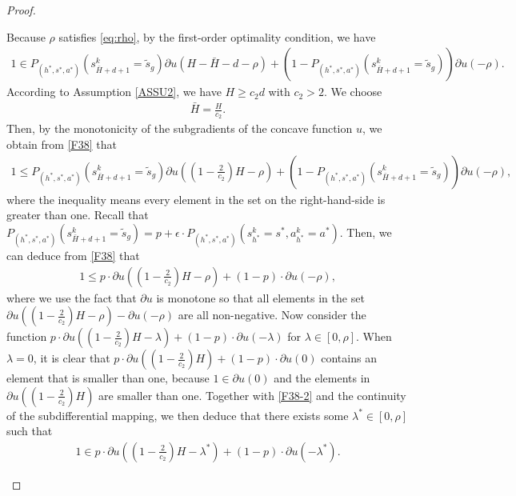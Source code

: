 \documentclass[11pt]{article}
\newcommand{\1}{\mathbbm{1}}
\begin{document}
\begin{proof}
\begin{itemize}
Because $\rho$ satisfies \eqref{eq:rho}, by the first-order optimality condition, we have
\begin{align}\label{F38}
1\in P_{(h^*,s^*,a^*)}(s^k_{\bar{H}+d+1}=\tilde{s}_g)\partial u(H-\bar{H}-d-\rho)+(1-P_{(h^*,s^*,a^*)}(s^k_{\bar{H}+d+1}=\tilde{s}_g))\partial u(-\rho).
\end{align}
According to Assumption \ref{ASSU2}, we have $H\geq c_2 d$ with $c_2 >2$. We choose 
\begin{align}\label{eq:barH}
\bar H = \frac{H}{c_2}.
\end{align}
Then, by the monotonicity of the subgradients of the concave function $u$, we obtain from \eqref{F38} that
\begin{align}\label{F55}
1 \le P_{(h^*,s^*,a^*)}(s^k_{\bar{H}+d+1}=\tilde{s}_g)\partial u\left( \left(1- \frac{2}{c_2}\right)H-\rho\right)+(1-P_{(h^*,s^*,a^*)}(s^k_{\bar{H}+d+1}=\tilde{s}_g))\partial u(-\rho),
\end{align}
where the inequality means every element in the set on the right-hand-side is greater than one. Recall that  $P_{(h^*,s^*,a^*)}(s^k_{\bar{H}+d+1}=\tilde{s}_g) =p+\epsilon \cdot P_{(h^*,s^*,a^*)}(s_{h^*}^k=s^*,a_{h^*}^k=a^*)$. Then, we can deduce from \eqref{F38} that
\begin{align}\label{F38-2}
1 \le p \cdot \partial u\left( \left(1- \frac{2}{c_2}\right)H-\rho\right)+(1- p) \cdot \partial u(-\rho),
\end{align}
where we use the fact that $\partial u$ is monotone so that all
elements in the set $\partial u( (1- \frac{2}{c_2})H-\rho) - \partial u(-\rho)$ are all non-negative. Now consider the function $p \cdot \partial u( (1- \frac{2}{c_2})H-\lambda)+(1- p) \cdot \partial u(-\lambda)$ for $\lambda\in [0, \rho]$. When $\lambda=0$, it is clear that $ p \cdot \partial u( (1- \frac{2}{c_2})H)+(1- p) \cdot \partial u(0)$ contains an element that is smaller than one, because $1 \in \partial u(0)$ and the elements in $\partial u( (1- \frac{2}{c_2})H)$ are smaller than one. Together with \eqref{F38-2} and the continuity of the subdifferential mapping, we then deduce that 
there exists some $\lambda^* \in [0, \rho]$ such that
\begin{align}\label{eq:p-eq}
1 \in  p \cdot \partial u \left(\left(1-\frac{2}{c_2}\right)H-\lambda^*\right)+(1-p)\cdot \partial u(-\lambda^*).
\end{align}



\end{itemize}
\end{proof}
\end{document}
